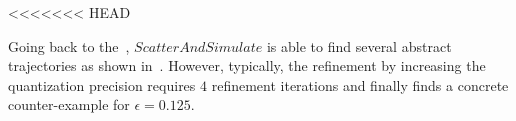 <<<<<<< HEAD
%
\begin{example}

Going back to the~, $ScatterAndSimulate$ is able to find
    several abstract trajectories as shown in~.
    However, typically, the refinement by increasing the quantization
    precision requires $4$ refinement iterations and finally finds a
    concrete counter-example for $\epsilon=0.125$.

\end{example}
